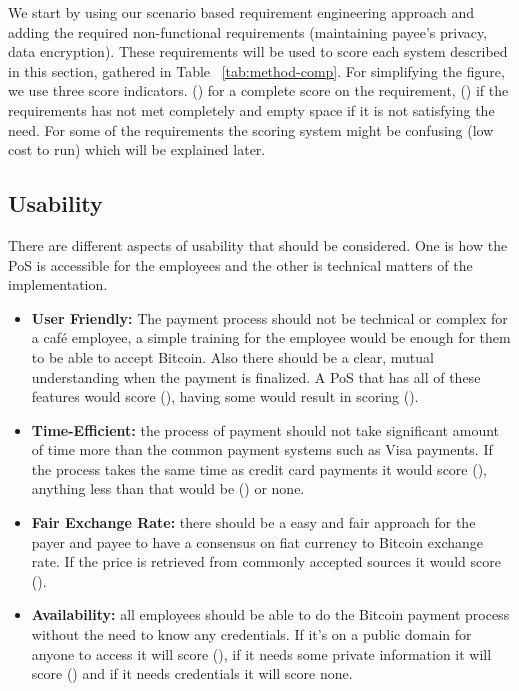 We start by using our scenario based requirement engineering approach and adding the required non-functional requirements (\eg maintaining payee's privacy, data encryption). These requirements will be used to score each system described in this section, gathered in Table ~\ref{tab:method-comp}. For simplifying the figure, we use three score indicators. (\full) for a complete score on the requirement, (\prt) if the requirements has not met completely and empty space if it is not satisfying the need. For some of the requirements the scoring system might be confusing (\eg low cost to run) which will be explained later.

\subsection{Usability} There are different aspects of usability that should be considered. One is how the PoS is accessible for the employees and the other is technical matters of the implementation.
\begin{itemize}

\item \textbf{User Friendly: }The payment process should not be technical or complex for a caf\'{e} employee, a simple training for the employee would be enough for them to be able to accept Bitcoin. Also there should be a clear, mutual understanding when the payment is finalized. A PoS that has all of these features would score (\full), having some would result in scoring (\prt).

\item \textbf{Time-Efficient: }the process of payment should not take significant amount of time more than the common payment systems such as Visa payments. If the process takes the same time as credit card payments it would score (\full), anything less than that would be (\prt) or none.

\item \textbf{Fair Exchange Rate: }there should be a easy and fair approach for the payer and payee to have a consensus on fiat currency to Bitcoin exchange rate. If the price is retrieved from commonly accepted sources it would score (\full).

\item \textbf{Availability: }all employees should be able to do the Bitcoin payment process without the need to know any credentials. If it's on a public domain for anyone to access it will score (\full), if it needs some private information it will score (\prt) and if it needs credentials it will score none.

\end{itemize}
